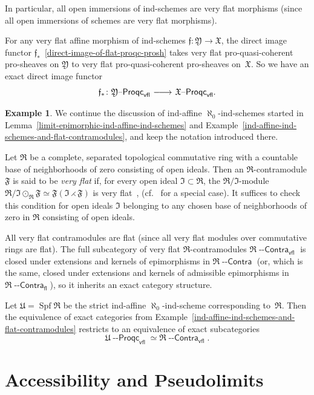 \documentclass[12pt,a4paper]{amsart}
\newcommand{\+}{\protect\nobreakdash-}
\renewcommand{\:}{\colon}
\newcommand{\rarrow}{\longrightarrow}
\newcommand{\ocn}{\odot}
\newcommand{\tim}{\rightthreetimes}
\newcommand{\lrarrow}{\mskip.5\thinmuskip\relbar\joinrel\relbar\joinrel
 \rightarrow\mskip.5\thinmuskip\relax}
\DeclareMathOperator{\Spf}{Spf}
\newcommand{\Contra}{{\operatorname{\mathsf{--Contra}}}}
\newcommand{\Proqc}{{\operatorname{\mathsf{--Proqc}}}}
\newcommand{\fl}{\mathsf{fl}}
\newcommand{\vfl}{\mathsf{vfl}}
\newcommand{\fX}{\mathfrak X}
\newcommand{\fY}{\mathfrak Y}
\newcommand{\fR}{\mathfrak R}
\newcommand{\fU}{\mathfrak U}
\newcommand{\fI}{\mathfrak I}
\newcommand{\fF}{\mathfrak F}
\newcommand{\ff}{\mathfrak f}
\newcommand{\Section}[1]{\bigskip\section{#1}\medskip}
\theoremstyle{plain}
\theoremstyle{definition}
\newtheorem{ex}[thm]{Example}
\begin{document}
 In particular, all open immersions of ind-schemes are very flat
morphisms (since all open immersions of schemes are very flat
morphisms).

 For any very flat affine morphism of ind-schemes $\ff\:\fY\rarrow\fX$,
the direct image functor $\ff_*$
\,\eqref{direct-image-of-flat-proqc-prosh} takes very flat
pro-quasi-coherent pro-sheaves on $\fY$ to very flat pro-quasi-coherent
pro-sheaves on~$\fX$.
 So we have an exact direct image functor
\begin{equation} \label{direct-image-of-very-flat-proqc-prosh}
 \ff_*\:\fY\Proqc_\vfl\lrarrow\fX\Proqc_\vfl.
\end{equation}

\begin{ex} \label{ind-affine-ind-schemes-and-very-flat-contramodules}
 We continue the discussion of ind-affine $\aleph_0$\+ind-schemes
started in Lemma~\ref{limit-epimorphic-ind-affine-ind-schemes}
and Example~\ref{ind-affine-ind-schemes-and-flat-contramodules},
and keep the notation introduced there.

 Let $\fR$ be a complete, separated topological commutative ring with
a countable base of neighborhoods of zero consisting of open ideals.
 Then an $\fR$\+contramodule $\fF$ is said to be \emph{very flat} if,
for every open ideal $\fI\subset\fR$, the $\fR/\fI$\+module
$\fR/\fI\ocn_\fR\fF\simeq\fF(\fI\tim\fF)$ is very
flat~\cite[Section~E.4]{Pcosh}, \cite[Example~7.12(3)]{PR}
(cf.~\cite[Section~2.12]{Pform} for a special case).
 It suffices to check this condition for open ideals $\fI$ belonging
to any chosen base of neighborhoods of zero in $\fR$ consisting of
open ideals.

 All very flat contramodules are flat (since all very flat modules
over commutative rings are flat).
 The full subcategory of very flat $\fR$\+contramodules
$\fR\Contra_\vfl$ is closed under extensions and kernels of
epimorphisms in $\fR\Contra$ (or, which is the same, closed under
extensions and kernels of admissible epimorphisms in $\fR\Contra_\fl$),
so it inherits an exact category structure.

 Let $\fU=\Spf\fR$ be the strict ind-affine $\aleph_0$\+ind-scheme
corresponding to~$\fR$.
 Then the equivalence of exact categories from
Example~\ref{ind-affine-ind-schemes-and-flat-contramodules}
restricts to an equivalence of exact subcategories
$$
 \fU\Proqc_\vfl\simeq\fR\Contra_\vfl.
$$
\end{ex}


\Section{Accessibility and Pseudolimits}  \label{accessibility-secn}
\end{document}

